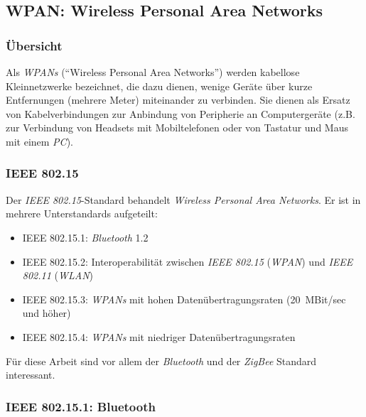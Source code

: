     \subsection{WPAN: Wireless Personal Area Networks}
        \subsubsection{Übersicht}
            Als \emph{WPANs} ("`Wireless Personal Area Networks"') werden kabellose Kleinnetzwerke bezeichnet, die dazu 
            dienen, wenige Geräte über kurze Entfernungen (mehrere Meter) miteinander zu verbinden. Sie dienen als Ersatz 
            von Kabelverbindungen zur Anbindung von Peripherie an Computergeräte (z.B. zur Verbindung von
            Headsets mit Mobiltelefonen oder von Tastatur und Maus mit einem \emph{PC}).
            

        \subsubsection{IEEE 802.15}
            Der \emph{IEEE 802.15}-Standard behandelt \textsl{Wireless Personal Area Networks}. Er ist in mehrere 
            Unterstandards aufgeteilt:

             \begin{itemize}
                \item{IEEE 802.15.1:} \emph{Bluetooth} 1.2
                \item{IEEE 802.15.2:} Interoperabilität zwischen \emph{IEEE 802.15} (\emph{WPAN}) 
                                      und \emph{IEEE 802.11} (\emph{WLAN})
                \item{IEEE 802.15.3:} \emph{WPANs} mit hohen Datenübertragungsraten (20~MBit/sec und höher)
                \item{IEEE 802.15.4:} \emph{WPANs} mit niedriger Datenübertragungsraten
            \end{itemize}

            Für diese Arbeit sind vor allem der \emph{Bluetooth} und der \emph{ZigBee} Standard interessant. 

        \subsubsection{IEEE 802.15.1: Bluetooth}\label{Bluetooth}

